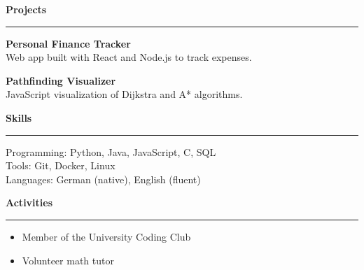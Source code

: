 \documentclass[11pt,a4paper]{article}
\begin{document}
\vspace{8pt}

\noindent \textbf{\large Projects}
\hrule
\vspace{6pt}

\textbf{Personal Finance Tracker} \\
Web app built with React and Node.js to track expenses.

\vspace{6pt}

\textbf{Pathfinding Visualizer} \\
JavaScript visualization of Dijkstra and A* algorithms.

\vspace{12pt}

\noindent \textbf{\large Skills}
\hrule
\vspace{6pt}

Programming: Python, Java, JavaScript, C, SQL \\
Tools: Git, Docker, Linux \\
Languages: German (native), English (fluent)

\vspace{12pt}

\noindent \textbf{\large Activities}
\hrule
\vspace{6pt}

\begin{itemize}
\item Member of the University Coding Club
\item Volunteer math tutor
\end{itemize}
\end{document}
